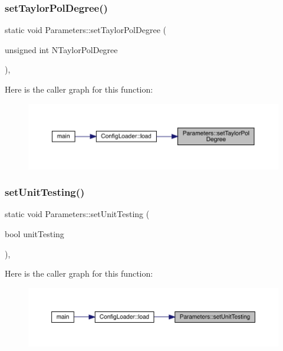 \subsubsection{\texorpdfstring{setTaylorPolDegree()}{setTaylorPolDegree()}}
{\footnotesize\ttfamily static void Parameters\+::set\+Taylor\+Pol\+Degree (\begin{DoxyParamCaption}\item[{unsigned int}]{N\+Taylor\+Pol\+Degree }\end{DoxyParamCaption})\hspace{0.3cm}{\ttfamily [inline]}, {\ttfamily [static]}}

Here is the caller graph for this function\+:\nopagebreak
\begin{figure}[H]
\begin{center}
\leavevmode
\includegraphics[width=350pt]{class_parameters_a68fb3eccef5dae481915be728ef61fb6_icgraph}
\end{center}
\end{figure}
\mbox{\label{class_parameters_a2d7077c967fffbdc6652559ec261b67c}} 
\subsubsection{\texorpdfstring{setUnitTesting()}{setUnitTesting()}}
{\footnotesize\ttfamily static void Parameters\+::set\+Unit\+Testing (\begin{DoxyParamCaption}\item[{bool}]{unit\+Testing }\end{DoxyParamCaption})\hspace{0.3cm}{\ttfamily [inline]}, {\ttfamily [static]}}

Here is the caller graph for this function\+:\nopagebreak
\begin{figure}[H]
\begin{center}
\leavevmode
\includegraphics[width=350pt]{class_parameters_a2d7077c967fffbdc6652559ec261b67c_icgraph}
\end{center}
\end{figure}
\mbox{\label{class_parameters_a2cf1ae12581e8f80dd88ce6c60f37c5f}} 
